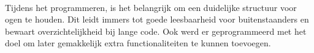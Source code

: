 \\
Tijdens het programmeren, is het belangrijk om een duidelijke structuur voor ogen te houden. Dit leidt immers tot goede leesbaarheid voor buitenstaanders en bewaart overzichtelijkheid bij lange code. Ook werd er geprogrammeerd met het doel om later gemakkelijk extra functionaliteiten te kunnen toevoegen.

